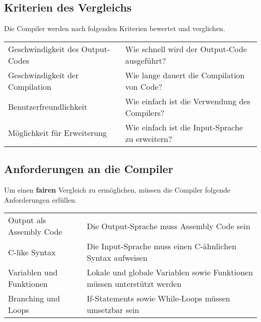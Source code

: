 \subsection{Kriterien des Vergleichs}
Die Compiler werden nach folgenden Kriterien bewertet und verglichen.

\begin{table}[h!]
    \begin{tabular}{l|l}
    Geschwindigkeit des Output-Codes    & Wie schnell wird der Output-Code ausgeführt?                      \\
    Geschwindigkeit der Compilation     & Wie lange dauert die Compilation von Code?                        \\
    Benutzerfreundlichkeit              & Wie einfach ist die Verwendung des Compilers?                     \\
    Möglichkeit für Erweiterung         & Wie einfach ist die Input-Sprache zu erweitern?                                 
    \end{tabular}
\end{table}

\subsection{Anforderungen an die Compiler}
Um einen \textbf{fairen} Vergleich zu ermöglichen, müssen die Compiler folgende Anforderungen erfüllen.

\begin{table}[h]
    \begin{tabular}{l|l}
    Output als Assembly Code        & Die Output-Sprache muss Assembly Code sein                               \\
    C-like Syntax                   & Die Input-Sprache muss einen C-ähnlichen Syntax aufweisen                \\
    Variablen und Funktionen        & Lokale und globale Variablen sowie Funktionen müssen unterstützt werden  \\
    Branching und Loops             & If-Statements sowie While-Loops müssen umsetzbar sein                            
    \end{tabular}
\end{table}

